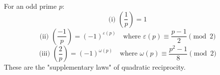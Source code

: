 For an odd prime $p$:
$$\text{(i) } \left(\frac{1}{p}\right) = 1$$
$$\text{(ii) } \left(\frac{-1}{p}\right) = (-1)^{\varepsilon(p)} \quad \text{where } \varepsilon(p) \equiv \frac{p-1}{2} \pmod{2}$$
$$\text{(iii) } \left(\frac{2}{p}\right) = (-1)^{\omega(p)} \quad \text{where } \omega(p) \equiv \frac{p^2-1}{8} \pmod{2}$$
These are the "supplementary laws" of quadratic reciprocity.
